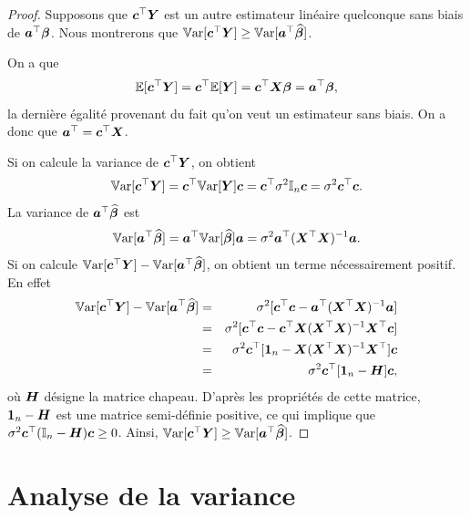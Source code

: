 \begin{proof}
Supposons que ${\bm{c}}^\top\bm{Y}$ est un autre estimateur linéaire quelconque sans biais de ${\bm{a}}^\top\bm\beta$. Nous montrerons que $\mathbb{V}\text{ar}[{\bm{c}}^\top{\bm{Y}}] \geq \mathbb{V}\text{ar}[{\bm{a}}^\top\widehat{\bm\beta}]$.

On a que
	\[ \mathbb{E}[{\bm{c}}^\top\bm{Y}] = {\bm{c}}^\top\mathbb{E}[\bm{Y}]={\bm{c}}^\top\bm{X}\bm\beta={\bm{a}}^\top\bm\beta,
\]
la dernière égalité provenant du fait qu'on veut un estimateur sans biais.
On a donc que ${\bm{a}}^\top={\bm{c}}^\top\bm{X}$.

Si on calcule la variance de ${\bm{c}}^\top\bm{Y}$, on obtient
	\[\mathbb{V}\text{ar}[{\bm{c}}^\top\bm{Y}]={\bm{c}}^\top\mathbb{V}\text{ar}[\bm{Y}]{\bm{c}} = {\bm{c}}^\top \sigma^2 \mathbb{I}_n {\bm{c}} = \sigma^2 {\bm{c}}^\top {\bm{c}}.
\]
La variance de ${\bm{a}}^\top\widehat{\bm\beta}$ est
	\[\mathbb{V}\text{ar}[{\bm{a}}^\top\widehat{\bm\beta}] = {\bm{a}}^\top\mathbb{V}\text{ar}[\widehat{\bm\beta}]{\bm{a}} = \sigma^2 {\bm{a}}^\top(\bm{X}^\top\bm{X})^{-1}{\bm{a}}.
\]
Si on calcule $\mathbb{V}\text{ar}[{\bm{c}}^\top\bm{Y}]-\mathbb{V}\text{ar}[{\bm{a}}^\top\widehat{\bm\beta}]$, on obtient un terme nécessairement positif. En effet
\begin{eqnarray*}
	\mathbb{V}\text{ar}[{\bm{c}}^\top\bm{Y}]-\mathbb{V}\text{ar}[{\bm{a}}^\top\widehat{\bm\beta}] &=& \sigma^2 [{\bm{c}}^\top{\bm{c}}-{\bm{a}}^\top(\bm{X}^\top\bm{X})^{-1}{\bm{a}}]\\
	&=& \sigma^2[{\bm{c}}^\top{\bm{c}}-{\bm{c}}^\top\bm{X}(\bm{X}^\top\bm{X})^{-1}\bm{X}^\top{\bm{c}}]\\
	&=& \sigma^2{\bm{c}}^\top[\bold{1}_n-\bm{X}(\bm{X}^\top\bm{X})^{-1}\bm{X}^\top]{\bm{c}}\\
	&=& \sigma^2{\bm{c}}^\top[\bold{1}_n-{\bm{H}}]{\bm{c}},
\end{eqnarray*}
où ${\bm{H}}$ désigne la matrice chapeau. D'après les propriétés de cette matrice, $\bold{1}_n-{\bm{H}}$ est une matrice semi-définie positive, ce qui implique que $\sigma^2{\bm{c}}^\top(\mathbb{I}_n-{\bm{H}}){\bm{c}} \geq 0$.
Ainsi, $\mathbb{V}\text{ar}[{\bm{c}}^\top\bm{Y}] \geq \mathbb{V}\text{ar}[{\bm{a}}^\top\widehat{\bm\beta}]$.
\end{proof}


\section{Analyse de la variance}

